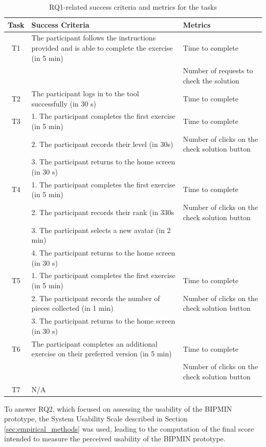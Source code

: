 \begin{table}[ht] 
\centering
\footnotesize
\caption{RQ1-related success criteria and metrics for the tasks}
\begin{tabular}{cp{}p{}} \toprule
 \textbf{Task} & \textbf{Success Criteria} & \textbf{Metrics} \\ \midrule
T1 & The participant follows the instructions provided and is able to complete the exercise (in 5 min) & Time to complete \\
& & Number of requests to check the solution \\ 
\midrule
T2 & The participant logs in to the tool successfully (in 30 s) & Time to complete \\ 
\midrule
T3 & 1. The participant completes the first exercise (in 5 min) & Time to complete \\ 
& 2. The participant records their level (in 30s) & Number of clicks on the check solution button \\ 
& 3. The participant returns to the home screen (in 30 s) & \\ 
\midrule
T4 & 1. The participant completes the first exercise (in 5 min) & Time to complete \\ 
& 2. The participant records their rank (in 330s & Number of clicks on the check solution button \\ 
& 3. The participant selects a new avatar (in 2 min) & \\ 
& 4. The participant returns to the home screen (in 30 s) &  \\ 
\midrule
T5 & 1. The participant completes the first exercise (in 5 min) & Time to complete \\ 
& 2. The participant records the number of pieces collected (in 1 min) & Number of clicks on the check solution button \\ 
& 3. The participant returns to the home screen (in 30 s)  & \\ 
\midrule
T6 & The participant completes an additional exercise on their preferred version (in 5 min) & Time to complete \\ 
& & Number of clicks on the check solution button \\ 
\midrule
T7 & N/A & \\ \bottomrule
\end{tabular} 
\label{tab:successCriteria}
\end{table}


To answer RQ2, which focused on assessing the usability of the BIPMIN prototype, the System Usability Scale described in Section \ref{sec:empirical_methods} \cite{brooke1996sus} was used, leading to the computation of the final score intended to measure the perceived usability of the BIPMIN prototype.

